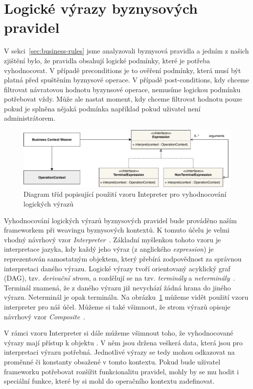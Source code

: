 \section{Logické výrazy byznysových pravidel}

V sekci~\ref{sec:business-rules} jsme analyzovali byznysová pravidla a jedním z
našich zjištění bylo, že pravidla obsahují logické podmínky, které je
potřeba vyhodnocovat. V případě preconditions je to ověření podmínky,
která musí být platná před spuštěním byznysové operace. V případě post-conditions,
kdy chceme filtrovat návratovou hodnotu byzynsové operace, nemusíme logickou podmínku
potřebovat vždy. Může ale nastat moment, kdy chceme filtrovat hodnotu pouze pokud je
splněna nějaká podmínka \textendash\xspace například pokud uživatel není administrátorem.

\begin{figure}
    \centering
    \includegraphics[keepaspectratio=true, width=1\linewidth]{figures/expression.pdf}
    \caption{Diagram tříd popisující použití vzoru Intepreter pro vyhodnocování logických výrazů}
    \label{fig:expression}
\end{figure}

Vyhodnocování logických výrazů byznysových pravidel bude prováděno naším frameworkem
při weavingu byznysových kontextů. K tomuto účelu je velmi vhodný návrhový vzor
\textit{Interpreter}~\cite{fowler2002patterns}. Základní myšlenkou tohoto vzoru je
interpretace jazyka, kdy každý jeho výraz (z anglického \textit{expression}) je reprezentován
samostatným objektem, který přebírá zodpovědnost za správnou interpretaci daného výrazu.
Logické výrazy tvoří orientovaný acyklický graf (\gls{DAG}), tzv. \textit{derivační strom},
a rozdělují se na tzv. \textit{terminály} a \textit{neterminály}~\cite{melichar2003jazyky}. Terminál znamená,
že z daného výrazu již nevychází žádná hrana do jiného výrazu. Neterminál je opak terminálu.
Na obrázku~\ref{fig:expression} můžeme vidět použití vzoru interpreter pro náš účel.
Můžeme si také všimnout, že strom výrazů opisuje návrhový vzor \textit{Composite}~\cite{fowler2002patterns}.

V rámci vzoru Interpreter si dále můžeme všimnout toho, že vyhodnocované výrazy mají přístup
k objektu . V něm jsou držena veškerá data, která jsou pro interpretaci
výrazu potřebná. Jednotlivé výrazy se tedy mohou odkazovat na proměnné či konstanty obsažené
v tomto kontextu. Pokud bude uživatel frameworku potřebovat rozšířit funkcionalitu pravidel,
mohly by se mu hodit i speciální funkce, které by si mohl do operačního kontextu zadefinovat.

